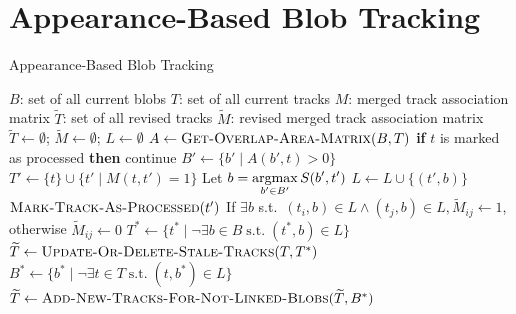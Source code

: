 \section{Appearance-Based Blob Tracking}
\label{sec:blob-appearance-based-blob-tracking}

\renewcommand{\algorithmicrequire}{\textbf{Input:}}
\renewcommand{\algorithmicensure}{\textbf{Output:}}
\renewcommand{\algorithmicforall}{\textbf{for each}}
\begin{algorithm}
\caption{Appearance-Based Blob Tracking}
\label{blob-tracking-algorithm}
\begin{algorithmic}
  \REQUIRE $B$: set of all current blobs
  \REQUIRE $T$: set of all current tracks
  \REQUIRE $M$: merged track association matrix
  \ENSURE $\widetilde{T}$: set of all revised tracks
  \ENSURE $\widetilde{M}$: revised merged track association matrix
  \STATE $\widetilde{T} \gets \emptyset$; $\widetilde{M} \gets \emptyset$; $L \gets \emptyset$
  \STATE $A \gets \textsc{Get-Overlap-Area-Matrix}(B, T)$
    \STATE \textbf{if} $t$ is marked as processed \textbf{then} continue
    \STATE $B' \gets \{ b' \mid A(b', t) > 0 \}$ 
    \STATE $T' \gets \{ t \} \cup \{ t' \mid M(t, t') = 1 \}$ 
        \STATE Let $b = \displaystyle\operatorname*{argmax}_{b' \in B'} S(b', t')$
	\STATE $L \gets L \cup \{ (t', b) \}$
	\STATE $\textsc{Mark-Track-As-Processed}(t')$
      \ENDFOR
    \ENDIF
  \ENDFOR
    \STATE If $\exists b$ s.t.\ $(t_i, b) \in L \wedge (t_j, b) \in L, \widetilde{M}_{ij} \gets 1$, otherwise $\widetilde{M}_{ij} \gets 0$
  \ENDFOR
  \STATE $T^* \gets \{ t^* \mid \neg\exists b \in B \;\text{s.t.}\; (t^*,b) \in L \}$ 
  \STATE $\widetilde{T} \gets \textsc{Update-Or-Delete-Stale-Tracks}(T,T^*)$
  \STATE $B^* \gets \{ b^* \mid \neg \exists t \in T \;\text{s.t.}\; (t, b^*) \in L \}$ 
  \STATE $\widetilde{T} \gets\textsc{Add-New-Tracks-For-Not-Linked-Blobs}(\widetilde{T},B^*)$
\end{algorithmic}
\end{algorithm}

